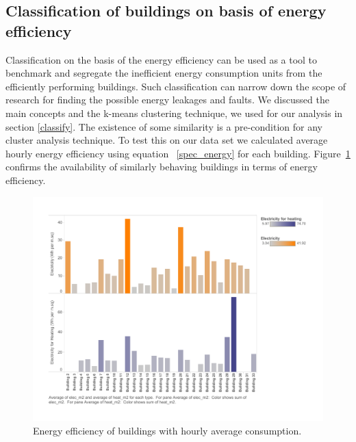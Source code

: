 \subsection{Classification of buildings on basis of energy efficiency}
Classification on the basis of the energy efficiency can be used as a tool to benchmark and segregate the inefficient energy consumption units from the efficiently performing buildings. Such classification can narrow down the scope of research for finding the possible energy leakages and faults. We discussed the main concepts and the k-means clustering technique, we used for our analysis in section \ref{classify}. The existence of some similarity is a pre-condition for any cluster analysis technique. To test this on our data set we calculated average hourly energy efficiency using equation ~\ref{spec_energy} for each building. Figure~\ref{fig:hr_m2} confirms the availability of similarly behaving buildings in terms of energy efficiency. 
\begin{figure}[!ht]
    \begin{center}
      \includegraphics[scale = 0.6]{images/hr_m2.pdf}
      \caption{Energy efficiency of buildings with hourly average consumption.}
      \label{fig:hr_m2}
    \end{center}
\end{figure} 

